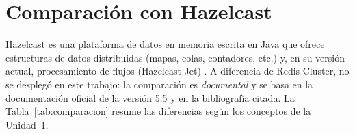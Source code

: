 \documentclass[11pt,a4paper]{article}
\begin{document}
\section{Comparación con Hazelcast}
\label{sec:comparacion}

Hazelcast es una plataforma de datos en memoria escrita en Java que ofrece
estructuras de datos distribuidas (mapas, colas, contadores, etc.) y, en su
versión actual, procesamiento de flujos (Hazelcast Jet)
\cite{gencer2021hazelcastjet}. A diferencia de Redis Cluster, no se desplegó
en este trabajo: la comparación es \emph{documental} y se basa en la
documentación oficial de la versión 5.5 y en la bibliografía citada. La
Tabla~\ref{tab:comparacion} resume las diferencias según los conceptos de la
Unidad~1.
\end{document}
